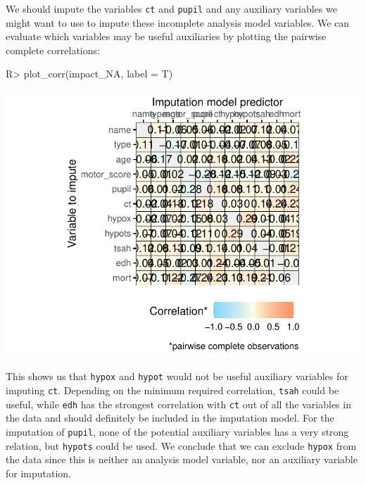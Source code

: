 \documentclass[
]{jss}
\begin{document}
We should impute the variables \texttt{ct} and \texttt{pupil} and any
auxiliary variables we might want to use to impute these incomplete
analysis model variables. We can evaluate which variables may be useful
auxiliaries by plotting the pairwise complete correlations:

\begin{CodeChunk}
\begin{CodeInput}
R> plot_corr(impact_NA, label = T)
\end{CodeInput}


\begin{center}\includegraphics{Imputation_of_Incomplete_Multilevel_Data_files/figure-latex/impact_corr-1} \end{center}

\end{CodeChunk}

This shows us that \texttt{hypox} and \texttt{hypot} would not be useful
auxiliary variables for imputing \texttt{ct}. Depending on the minimum
required correlation, \texttt{tsah} could be useful, while \texttt{edh}
has the strongest correlation with \texttt{ct} out of all the variables
in the data and should definitely be included in the imputation model.
For the imputation of \texttt{pupil}, none of the potential auxiliary
variables has a very strong relation, but \texttt{hypots} could be used.
We conclude that we can exclude \texttt{hypox} from the data since this
is neither an analysis model variable, nor an auxiliary variable for
imputation.
\end{document}
